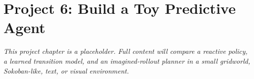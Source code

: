 \chapter*{Project 6: Build a Toy Predictive Agent}
\label{project:toy-predictive-agent}


\textit{This project chapter is a placeholder. Full content will compare a reactive policy, a learned transition model, and an imagined-rollout planner in a small gridworld, Sokoban-like, text, or visual environment.}
